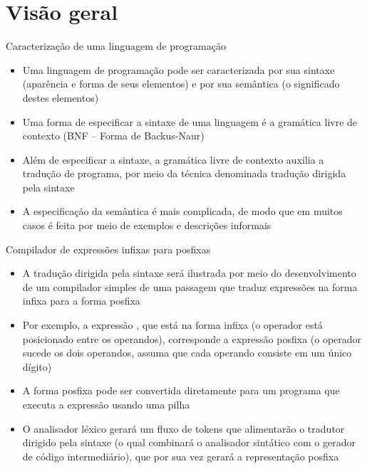 \section{Visão geral}

\begin{frame}[fragile]{Caracterização de uma linguagem de programação}

    \begin{itemize}
        \item Uma linguagem de programação pode ser caracterizada por sua sintaxe (aparência e forma de seus elementos) e por sua semântica (o significado destes
            elementos)

        \item Uma forma de especificar a sintaxe de uma linguagem é a gramática livre de contexto (BNF -- Forma de Backus-Naur)

        \item Além de especificar a sintaxe, a gramática livre de contexto auxilia a tradução de programa, por meio da técnica denominada tradução dirigida
            pela sintaxe

        \item A especificação da semântica é mais complicada, de modo que em muitos casos é feita por meio de exemplos e descrições informais
    \end{itemize}

\end{frame}

\begin{frame}[fragile]{Compilador de expressões infixas para posfixas}

    \begin{itemize}
        \item A tradução dirigida pela sintaxe será ilustrada por meio do desenvolvimento de um compilador simples de uma passagem que traduz expressões
            na forma infixa para a forma posfixa

        \item Por exemplo, a expressão , que está na forma infixa (o operador está posicionado entre os operandos), corresponde a expressão
            posfixa  (o operador sucede os dois operandos, assuma que cada operando consiste em um único dígito)

        \item A forma posfixa pode ser convertida diretamente para um programa que executa a expressão usando uma pilha

        \item O analisador léxico gerará um fluxo de tokens que alimentarão o tradutor dirigido pela sintaxe (o qual combinará o analisador sintático com o gerador
            de código intermediário), que por sua vez gerará a representação posfixa
    \end{itemize}

\end{frame}

